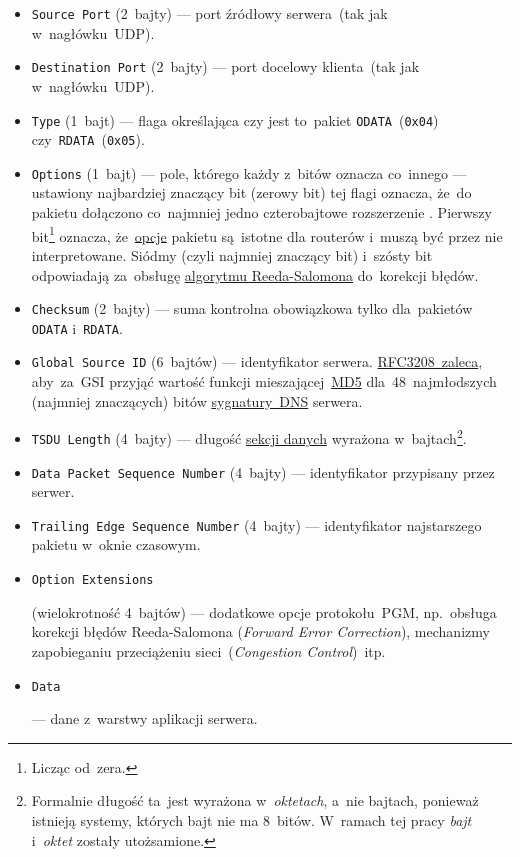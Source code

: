 \documentclass[thesis]{subfiles}
\begin{document}
\begin{itemize}
	\item \texttt{Source~Port} (2~bajty) --- port źródłowy serwera~(tak jak w~nagłówku~UDP).
	\item \texttt{Destination~Port} (2~bajty) --- port docelowy klienta~(tak jak w~nagłówku~UDP).
	\item \texttt{Type} (1~bajt) --- flaga określająca czy jest to~pakiet \texttt{ODATA}~(\texttt{0x04}) czy~\texttt{RDATA}~(\texttt{0x05}).
	\item \texttt{Options} (1~bajt) --- pole, którego każdy z~bitów oznacza co~innego --- ustawiony najbardziej znaczący bit (zerowy bit) tej flagi oznacza, że~do pakietu dołączono co~najmniej jedno czterobajtowe rozszerzenie . Pierwszy bit\footnote{Licząc od~zera.} oznacza, że~\hyperlink{itm:optext}{opcje} pakietu są~istotne dla routerów i~muszą być przez nie interpretowane. Siódmy (czyli najmniej znaczący bit) i~szósty bit odpowiadają za~obsługę \href{https://en.wikipedia.org/wiki/Reed\%E2\%80\%93Solomon\_error\_correction}{algorytmu Reeda-Salomona} do~korekcji błędów.
	\item \texttt{Checksum} (2~bajty) --- suma kontrolna obowiązkowa tylko dla~pakietów \texttt{ODATA} i~\texttt{RDATA}.
	\item \texttt{Global Source~ID} (6~bajtów) --- identyfikator serwera. \href{https://tools.ietf.org/html/rfc3208\#page-33}{RFC3208~zaleca}, aby~za~GSI przyjąć wartość funkcji mieszającej~\href{https://en.wikipedia.org/wiki/MD5}{MD5} dla~48~najmłodszych (najmniej znaczących) bitów \href{https://tools.ietf.org/html/rfc2535\#section-4}{sygnatury~DNS} serwera.
	\item \texttt{TSDU~Length} (4~bajty) --- długość \hyperlink{itm:datasec}{sekcji danych} wyrażona w~bajtach\footnote{Formalnie długość ta~jest wyrażona w~\emph{oktetach}, a~nie bajtach, ponieważ istnieją systemy, których bajt nie ma 8~bitów. W~ramach tej pracy \emph{bajt} i~\emph{oktet} zostały utożsamione.}.
	\item \texttt{Data Packet Sequence Number} (4~bajty) --- identyfikator przypisany przez serwer.
	\item \texttt{Trailing Edge Sequence Number} (4~bajty) --- identyfikator najstarszego pakietu w~oknie czasowym.
	\item \hypertarget{itm:optext}{\texttt{Option Extensions}} (wielokrotność 4~bajtów) --- dodatkowe opcje protokołu~PGM, np.~obsługa korekcji błędów Reeda-Salomona (\emph{Forward Error Correction}), mechanizmy zapobieganiu przeciążeniu sieci~(\emph{Congestion Control})~itp.
	\item \hypertarget{itm:datasec}{\texttt{Data}} --- dane z~warstwy aplikacji serwera.
\end{itemize}
\end{document}
